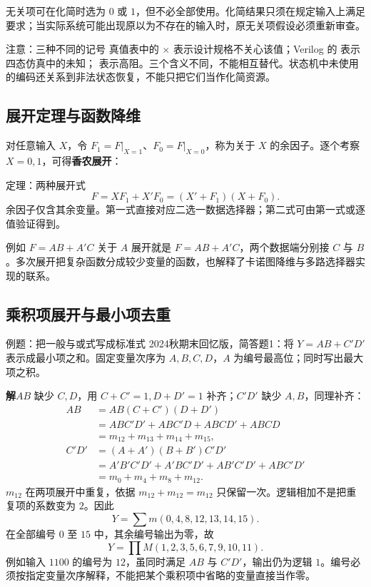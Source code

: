 \documentclass[UTF8,fontset=none,zihao=-4,a4paper]{ctexart}
\newcommand{\term}[1]{\textbf{#1}}
\newcommand{\sol}{\par\noindent\textbf{解}\quad}
\newcommand{\code}[1]{\allowbreak{\small\texttt{\detokenize{#1}}}\allowbreak}
\begin{document}
无关项可在化简时选为 $0$ 或 $1$，但不必全部使用。化简结果只须在规定输入上满足要求；当实际系统可能出现原以为不存在的输入时，原无关项假设必须重新审查。
\begin{infobox}{注意：三种不同的记号}
真值表中的 $\times$ 表示设计规格不关心该值；Verilog 的 \code{x} 表示四态仿真中的未知；\code{z} 表示高阻。三个含义不同，不能相互替代。状态机中未使用的编码还关系到非法状态恢复，不能只把它们当作化简资源。
\end{infobox}

\subsection{展开定理与函数降维}
对任意输入 $X$，令 $F_1=F|_{X=1}$、$F_0=F|_{X=0}$，称为关于 $X$ 的余因子。逐个考察 $X=0,1$，可得\term{香农展开}：
\begin{infobox}{定理：两种展开式}
\[
F=XF_1+X'F_0=(X'+F_1)(X+F_0).
\]
余因子仅含其余变量。第一式直接对应二选一数据选择器；第二式可由第一式或逐值验证得到。
\end{infobox}
例如 $F=AB+A'C$ 关于 $A$ 展开就是 $F=AB+A'C$，两个数据端分别接 $C$ 与 $B$。多次展开把复杂函数分成较少变量的函数，也解释了卡诺图降维与多路选择器实现的联系。

\subsection{乘积项展开与最小项去重}
\begin{infobox}{例题：把一般与或式写成标准式}
2024秋期末回忆版，简答题1：将 $Y=AB+C'D'$ 表示成最小项之和。固定变量次序为 $A,B,C,D$，$A$ 为编号最高位；同时写出最大项之积。
\end{infobox}
\sol $AB$ 缺少 $C,D$，用 $C+C'=1,D+D'=1$ 补齐；$C'D'$ 缺少 $A,B$，同理补齐：
\begin{align*}
AB&=AB(C+C')(D+D')\\
  &=ABC'D'+ABC'D+ABCD'+ABCD\\
  &=m_{12}+m_{13}+m_{14}+m_{15},\\
C'D'&=(A+A')(B+B')C'D'\\
  &=A'B'C'D'+A'BC'D'+AB'C'D'+ABC'D'\\
  &=m_0+m_4+m_8+m_{12}.
\end{align*}
$m_{12}$ 在两项展开中重复，依据 $m_{12}+m_{12}=m_{12}$ 只保留一次。逻辑相加不是把重复项的系数变为 $2$。因此
\[
Y=\sum m(0,4,8,12,13,14,15).
\]
在全部编号 $0$ 至 $15$ 中，其余编号输出为零，故
\[
Y=\prod M(1,2,3,5,6,7,9,10,11).
\]
例如输入 $1100$ 的编号为 $12$，虽同时满足 $AB$ 与 $C'D'$，输出仍为逻辑 $1$。编号必须按指定变量次序解释，不能把某个乘积项中省略的变量直接当作零。
\end{document}

